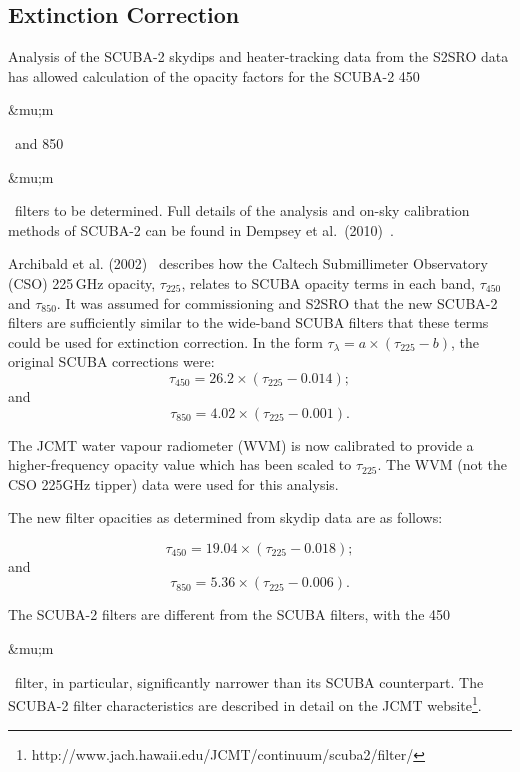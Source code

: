 \documentclass[twoside,11pt]{article}
\newcommand{\micron}{\mbox{\,${\umu}$m}}            %
\newcommand{\htmladdnormallinkfoot}[2]{#1\footnote{#2}}
\renewcommand{\_}{\texttt{\symbol{95}}}
\renewcommand{\micron}{\begin{rawhtml}&mu;m\end{rawhtml}}
\begin{document}
\subsection{Extinction Correction}

Analysis of the SCUBA-2 skydips and heater-tracking data from the
S2SRO data has allowed calculation of the opacity factors for the
SCUBA-2 450\micron\ and 850\micron\ filters to be determined. Full
details of the analysis and on-sky calibration methods of SCUBA-2 can
be found in Dempsey et al.\ (2010)~\cite{dempsey-spie}.

Archibald et al. (2002)~\cite{archibald} describes how the
Caltech Submillimeter Observatory (CSO) 225\,GHz opacity,
$\tau_{225}$, relates to SCUBA opacity terms in each band,
$\tau_{450}$ and $\tau_{850}$. It was assumed for commissioning and
S2SRO that the new SCUBA-2 filters are sufficiently similar to the
wide-band SCUBA filters that these terms could be used for extinction
correction. In the form $\tau_{\lambda} = a \times (\tau_{225} - b)$,
the original SCUBA corrections were:
\begin{equation}
\tau_{450} = 26.2 \times (\tau_{225} - 0.014);
\end{equation}
and
\begin{equation}
\tau_{850} = 4.02 \times (\tau_{225} - 0.001).
\end{equation}

The JCMT water vapour radiometer (WVM) is now calibrated to provide a
higher-frequency opacity value which has been scaled to
$\tau_{225}$. The WVM (not the CSO 225GHz tipper) data were used for
this analysis.

The new filter opacities as determined from skydip data are as
follows:

\begin{equation}
\tau_{450} = 19.04 \times (\tau_{225} - 0.018);
\end{equation}
and
\begin{equation}
\tau_{850} = 5.36 \times (\tau_{225} - 0.006).
\end{equation}

The SCUBA-2 filters are different from the SCUBA filters, with the
450\micron\ filter, in particular, significantly narrower than its
SCUBA counterpart. The SCUBA-2 filter characteristics are described in
detail \htmladdnormallinkfoot{on the JCMT
  website}{http://www.jach.hawaii.edu/JCMT/continuum/scuba2/filter/}.
\end{document}

